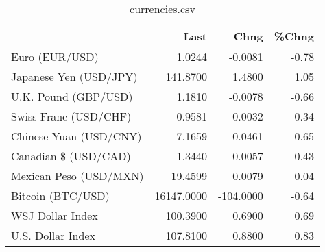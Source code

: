 \documentclass{article}%
\begin{document}
%


\begin{table}[htbp]%
\caption{currencies.csv}%
\centering%
\begin{adjustbox}{width=1\textwidth}%
\begin{tabular}{lrrr}
\toprule
                       &       Last &      Chng &  \%Chng \\
\midrule
        Euro (EUR/USD) &     1.0244 &   -0.0081 &  -0.78 \\
Japanese Yen (USD/JPY) &   141.8700 &    1.4800 &   1.05 \\
  U.K. Pound (GBP/USD) &     1.1810 &   -0.0078 &  -0.66 \\
 Swiss Franc (USD/CHF) &     0.9581 &    0.0032 &   0.34 \\
Chinese Yuan (USD/CNY) &     7.1659 &    0.0461 &   0.65 \\
  Canadian \$ (USD/CAD) &     1.3440 &    0.0057 &   0.43 \\
Mexican Peso (USD/MXN) &    19.4599 &    0.0079 &   0.04 \\
     Bitcoin (BTC/USD) & 16147.0000 & -104.0000 &  -0.64 \\
      WSJ Dollar Index &   100.3900 &    0.6900 &   0.69 \\
     U.S. Dollar Index &   107.8100 &    0.8800 &   0.83 \\
\bottomrule
\end{tabular}
%
\end{adjustbox}%
\end{table}

%
\end{document}
